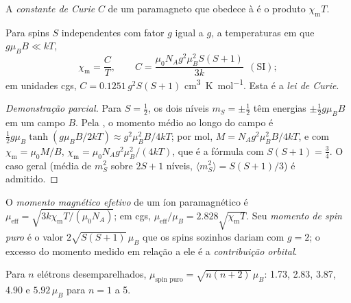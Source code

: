 \begin{definition}\label{def:b3:complex-spectra-magnetism:curie}
A \emph{constante de Curie} $C$ de um paramagneto que obedece à
 é o produto $\chi_{\mathrm m}T$.
\end{definition}

\begin{theorem}\label{thm:b3:complex-spectra-magnetism:curie}
Para spins $S$ independentes com fator $g$ igual a $g$, a temperaturas em que $g\mu_BB \ll kT$,
\[
  \chi_{\mathrm m} = \frac{C}{T}, \qquad C = \frac{\mu_0N_Ag^2\mu_B^2S(S+1)}{3k}\ \ (\text{SI});
\]
em unidades cgs, $C = 0.1251\,g^2S(S+1)$ \unit{cm^3.K.mol^{-1}}. Esta é a \emph{lei de Curie}.
\end{theorem}

\begin{proof}[Demonstração parcial]
Para $S = \frac12$, os dois níveis $m_S = \pm\frac12$ têm energias $\pm\frac12g\mu_BB$ em um campo $B$. Pela
, o momento médio ao longo do campo é $\frac12g\mu_B\tanh(g\mu_BB/2kT) \approx
g^2\mu_B^2B/4kT$; por mol, $M = N_Ag^2\mu_B^2B/4kT$, e com $\chi_{\mathrm m} = \mu_0M/B$, $\chi_{\mathrm m} = \mu_0N_Ag^2\mu_B^2/(4kT)$,
que é a fórmula com $S(S+1) = \frac34$. O caso geral (média de $m_S^2$ sobre $2S + 1$
níveis, $\langle m_S^2\rangle = S(S+1)/3$) é admitido.
\end{proof}

\begin{definition}\label{def:b3:complex-spectra-magnetism:moment}
O \emph{momento magnético efetivo} de um íon
paramagnético é $\mu_{\mathrm{eff}} = \sqrt{3k\chi_{\mathrm m}T/(\mu_0N_A)}$; em cgs, $\mu_{\mathrm{eff}}/\mu_B = 2.828\sqrt{\chi_{\mathrm m}T}$. Seu
\emph{momento de spin puro} é o valor $2\sqrt{S(S+1)}\,\mu_B$ que os spins
sozinhos dariam com $g = 2$; o excesso do momento medido em relação a ele é a
\emph{contribuição orbital}.
\end{definition}

\begin{proposition}\label{prop:b3:complex-spectra-magnetism:spin-only}
Para $n$ elétrons desemparelhados, $\mu_{\text{spin puro}} = \sqrt{n(n+2)}\,\mu_B$: 1.73, 2.83, 3.87, 4.90 e $5.92\,\mu_B$ para
$n = 1$ a 5.
\end{proposition}


